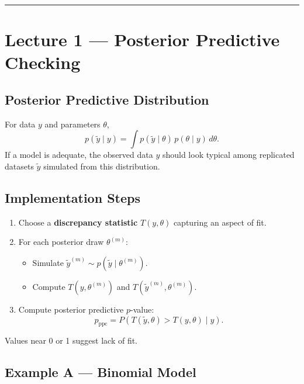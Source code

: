 \documentclass[
  letterpaper,
  DIV=11,
  numbers=noendperiod]{scrreprt}
\providecommand{\tightlist}{%
  \setlength{\itemsep}{0pt}\setlength{\parskip}{0pt}}
\begin{document}
\begin{center}\rule{0.5\linewidth}{0.5pt}\end{center}

\section{Lecture 1 --- Posterior Predictive
Checking}\label{lecture-1-posterior-predictive-checking}

\subsection{Posterior Predictive
Distribution}\label{posterior-predictive-distribution-1}

For data \(y\) and parameters \(\theta\), \[
p(\tilde{y}\mid y) = \int p(\tilde{y}\mid\theta)\,p(\theta\mid y)\,d\theta.
\] If a model is adequate, the observed data \(y\) should look typical
among replicated datasets \(\tilde{y}\) simulated from this
distribution.

\subsection{Implementation Steps}\label{implementation-steps}

\begin{enumerate}
\def\labelenumi{\arabic{enumi}.}
\tightlist
\item
  Choose a \textbf{discrepancy statistic} \(T(y,\theta)\) capturing an
  aspect of fit.\\
\item
  For each posterior draw \(\theta^{(m)}\):

  \begin{itemize}
  \tightlist
  \item
    Simulate \(\tilde{y}^{(m)}\!\sim\!p(\tilde{y}\mid\theta^{(m)})\).\\
  \item
    Compute \(T(y,\theta^{(m)})\) and
    \(T(\tilde{y}^{(m)},\theta^{(m)})\).\\
  \end{itemize}
\item
  Compute posterior predictive \(p\)-value:\\
  \[
  p_{\text{ppc}}=P\!\left(T(\tilde{y},\theta)\!>\!T(y,\theta)\mid y\right).
  \]
\end{enumerate}

Values near 0 or 1 suggest lack of fit.

\subsection{Example A --- Binomial
Model}\label{example-a-binomial-model}
\end{document}
